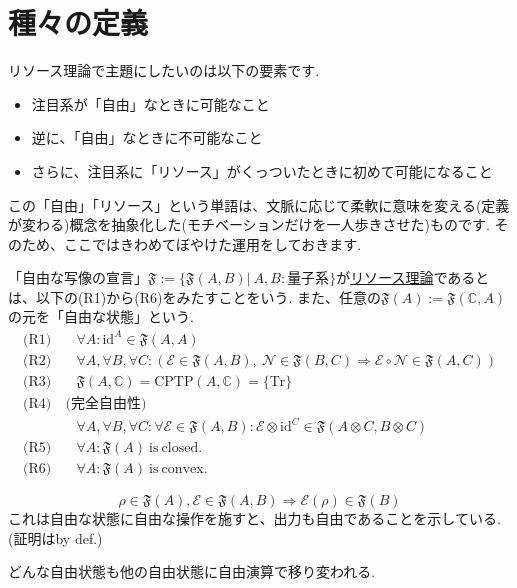 \documentclass[uplatex, a4paper]{jsarticle}
\begin{document}
\section{種々の定義}
\begin{mtvn}
  リソース理論で主題にしたいのは以下の要素です.
  \begin{itemize}
    \item 注目系が「自由」なときに可能なこと
    \item 逆に、「自由」なときに不可能なこと
    \item さらに、注目系に「リソース」がくっついたときに初めて可能になること
  \end{itemize}
  この「自由」「リソース」という単語は、文脈に応じて柔軟に意味を変える(定義が変わる)概念を抽象化した(モチベーションだけを一人歩きさせた)ものです.
  そのため、ここではきわめてぼやけた運用をしておきます.
\end{mtvn}
\begin{defn}
  「自由な写像の宣言」$\mathfrak{F} := \{ \mathfrak{F}(A,B)| \:A,B:\text{量子系} \}$が\underline{リソース理論}であるとは、以下の(R1)から(R6)をみたすことをいう. 
  また、任意の$\mathfrak{F}(A) := \mathfrak{F}(\mathbb{C}, A)$の元を「自由な状態」という.
  \begin{align*}
    \textrm{(R1)}& \quad \forall A: \mathrm{id}^A \in \mathfrak{F}(A, A) \\
    \textrm{(R2)}& \quad \forall A, \forall B, \forall C: \left( \mathscr{E} \in \mathfrak{F}(A, B), \:\mathscr{N} \in \mathfrak{F}(B, C) 
                  \Rightarrow \mathscr{E} \circ \mathscr{N} \in \mathfrak{F}(A, C) \right) \\
    \textrm{(R3)}& \quad \mathfrak{F}(A, \mathbb{C}) = \mathrm{CPTP}(A, \mathbb{C}) = \{ \mathrm{Tr} \} \\
    \textrm{(R4)}& \: \textrm{(完全自由性)} \\
                &\quad \forall A, \forall B, \forall C: \forall \mathscr{E} \in \mathfrak{F}(A,B): 
                  \mathscr{E}\otimes \mathrm{id}^C \in \mathfrak{F}(A\otimes C, B\otimes C) \\
    \textrm{(R5)}& \quad \forall A: \mathfrak{F}(A) \: \mathrm{is \: closed.} \\
    \textrm{(R6)}& \quad \forall A: \mathfrak{F}(A) \: \mathrm{is \: convex.}
  \end{align*}
\end{defn}
\begin{prop}["黄金律"]
  \[ \rho \in \mathfrak{F}(A), \mathscr{E} \in \mathfrak{F}(A, B) 
  \Rightarrow \mathscr{E}(\rho) \in \mathfrak{F}(B) \]
  これは自由な状態に自由な操作を施すと、出力も自由であることを示している.(証明はby def.)
\end{prop}
\begin{rmk}
  どんな自由状態も他の自由状態に自由演算で移り変われる.
\end{rmk}
\end{document}

